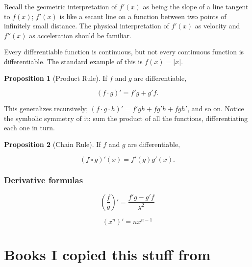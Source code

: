 \documentclass{article}
\theoremstyle{definition}
\newtheorem{proposition}{Proposition}[section]
\begin{document}
Recall the geometric interpretation of $f'(x)$ as being the slope of a line
tangent to $f(x)$; $f'(x)$ is like a secant line on a function between two
points of infinitely small distance. The physical interpretation of $f'(x)$ as
velocity and $f''(x)$ as acceleration should be familiar.

Every differentiable function is continuous, but not every continuous function is differentiable. The standard example of this is $f(x) = |x|$.

\begin{proposition}[Product Rule] 

If $f$ and $g$ are differentiable, 

\begin{equation}
(f \cdot g)' = f'g + g'f.
\end{equation}


\end{proposition} 

This generalizes recursively; $(f \cdot g \cdot h)' = f'gh + fg'h + fgh'$, and
so on. Notice the symbolic symmetry of it: sum the product of all the functions,
differentiating each one in turn.

\begin{proposition}[Chain Rule]

If $f$ and $g$ are differentiable,

\begin{equation}
(f \circ g)'(x) = f'(g)g'(x).
\end{equation}


\end{proposition}

\subsubsection{Derivative formulas}

\begin{equation}
\left(\frac{f}{g}\right)' = \frac{f'g - g'f}{g^2}
\end{equation}

\begin{equation}
(x^n)' = nx^{n-1}
\end{equation}

\section{Books I copied this stuff from} \label{bibliography}
\end{document}
